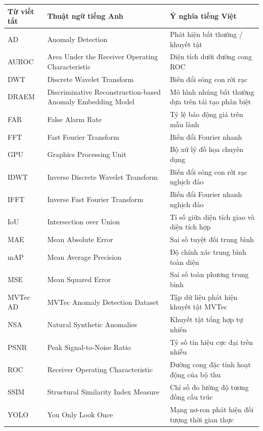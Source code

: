 \documentclass[12pt,a4paper,oneside]{report}
\begin{document}
\begin{table}[h]
\centering
\begin{tabularx}{\textwidth}{l p{5.5cm} X}
\toprule
\textbf{Từ viết tắt} & \textbf{Thuật ngữ tiếng Anh} & \textbf{Ý nghĩa tiếng Việt} \\
\midrule
AD & Anomaly Detection & Phát hiện bất thường / khuyết tật \\
AUROC & Area Under the Receiver Operating Characteristic & Diện tích dưới đường cong ROC \\
DWT & Discrete Wavelet Transform & Biến đổi sóng con rời rạc \\
DRAEM & Discriminative Reconstruction-based Anomaly Embedding Model & Mô hình nhúng bất thường dựa trên tái tạo phân biệt \\
FAR & False Alarm Rate & Tỷ lệ báo động giả trên mẫu lành \\
FFT & Fast Fourier Transform & Biến đổi Fourier nhanh \\
GPU & Graphics Processing Unit & Bộ xử lý đồ họa chuyên dụng \\
IDWT & Inverse Discrete Wavelet Transform & Biến đổi sóng con rời rạc nghịch đảo \\
IFFT & Inverse Fast Fourier Transform & Biến đổi Fourier nhanh nghịch đảo \\
IoU & Intersection over Union & Tỉ số giữa diện tích giao và diện tích hợp \\
MAE & Mean Absolute Error & Sai số tuyệt đối trung bình \\
mAP & Mean Average Precision & Độ chính xác trung bình toàn diện \\
MSE & Mean Squared Error & Sai số toàn phương trung bình \\
MVTec AD & MVTec Anomaly Detection Dataset & Tập dữ liệu phát hiện khuyết tật MVTec \\
NSA & Natural Synthetic Anomalies & Khuyết tật tổng hợp tự nhiên \\
PSNR & Peak Signal-to-Noise Ratio & Tỷ số tín hiệu cực đại trên nhiễu \\
ROC & Receiver Operating Characteristic & Đường cong đặc tính hoạt động của bộ thu \\
SSIM & Structural Similarity Index Measure & Chỉ số đo lường độ tương đồng cấu trúc \\
YOLO & You Only Look Once & Mạng nơ-ron phát hiện đối tượng thời gian thực \\
\bottomrule
\end{tabularx}
\end{table}

\newpage


\newpage


\newpage


\newpage


\newpage


\newpage

\end{document}
